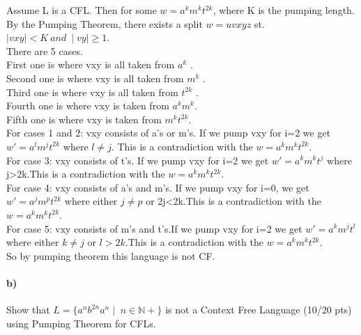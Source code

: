 \documentclass[a4paper,12pt]{article}
\begin{document}
\begin{tcolorbox}
Assume L is a CFL. Then for some $w=a^km^kt^{2k}$, where K is the pumping length. By the Pumping Theorem, there exists a split $w=uvxyz$ st. $\mid vxy \mid < K \ and \ \mid vy \mid\geq 1$.\\
There are 5 cases.\\
First one is where vxy is all taken from $a^k$ .\\
Second one is where vxy is all taken from $m^k$ .\\
Third one is where vxy is all taken from $t^{2k}$ .\\
Fourth one is where vxy is taken from $a^km^k$.\\
Fifth one is where vxy is taken from $m^kt^{2k}$.\\
For cases 1 and 2: vxy consists of a's or m's. If we pump vxy for i=2 we get $w'=a^lm^jt^{2k}$ where $l \neq j$. This is a contradiction with the $w=a^km^kt^{2k}$.\\
For case 3: vxy consists of t's. If we pump vxy for i=2 we get $w'=a^km^kt^j$ where j>2k.This is a contradiction with the $w=a^km^kt^{2k}$.\\
For case 4: vxy consists of a's and m's. If we pump vxy for i=0, we get $w'=a^jm^pt^{2k}$ where either $j \neq p$ or 2j<2k.This is a contradiction with the $w=a^km^kt^{2k}$.\\
For case 5: vxy consists of m's and t's.If we pump vxy for i=2 we get $w'=a^km^jt^l$ where either $k \neq j$ or $l > 2k$.This is a contradiction with the $w=a^km^kt^{2k}$.\\
So by pumping theorem this language is not CF.
\end{tcolorbox}


\paragraph{b)} Show that $L=\{a^n b^{2n} a^n \mid \; n \in \mathbb{N+} \}$ is not a Context Free Language \hfill \small{(10/20 pts)} \\
using Pumping Theorem for CFLs. \\
\end{document}
